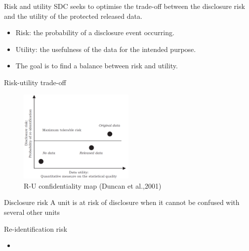 \documentclass[
  ignorenonframetext,
  aspectratio=169,
]{beamer}
\begin{document}
\begin{frame}{Risk and utility}
\protect\hypertarget{risk-and-utility}{}
SDC seeks to optimise the trade-off between the disclosure risk and the
utility of the protected released data.

\begin{itemize}
\item
  Risk: the probability of a disclosure event occurring.
\item
  Utility: the usefulness of the data for the intended purpose.
\item
  The goal is to find a balance between risk and utility.
\end{itemize}
\end{frame}

\begin{frame}{Risk-utility trade-off}
\protect\hypertarget{risk-utility-trade-off}{}
\begin{figure}

{\centering \includegraphics[width=0.5\textwidth,height=\textheight]{gallery/R-U confidentiality map.png}

}

\caption{R-U confidentiality map (Duncan et al.,2001)}

\end{figure}
\end{frame}

\begin{frame}{Disclosure risk}
\protect\hypertarget{disclosure-risk}{}
A unit is at risk of disclosure when it cannot be confused with several
other units
\end{frame}

\begin{frame}{Re-identification risk}
\protect\hypertarget{re-identification-risk}{}
\begin{itemize}
\item
  \color{red}{attacker scenarios and risk measures in more detail using examples}
\end{itemize}
\end{frame}
\end{document}
